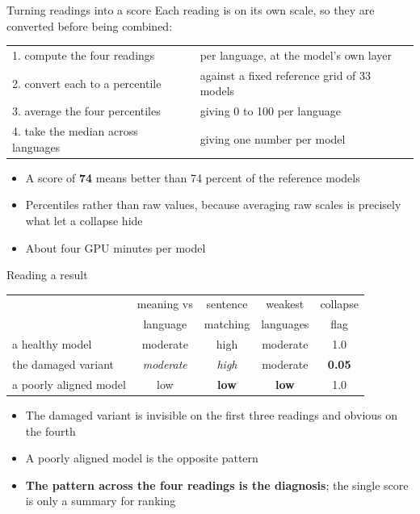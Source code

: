 \documentclass[aspectratio=169,11pt]{beamer}
\newcommand{\Hi}[1]{{\color{acc}\textbf{#1}}}
\newcommand{\Bad}[1]{{\color{warn}\textbf{#1}}}
\begin{document}
\begin{frame}{Turning readings into a score}
Each reading is on its own scale, so they are converted before being
combined:
\vspace{10pt}
\begin{center}\small
\begin{tabular}{ll}
\toprule
1. compute the four readings & per language, at the model's own layer\\
2. convert each to a percentile & against a fixed reference grid of 33
models\\
3. average the four percentiles & giving 0 to 100 per language\\
4. take the median across languages & giving one number per model\\
\bottomrule
\end{tabular}
\end{center}
\vspace{12pt}
\begin{itemize}\setlength\itemsep{4pt}
\item A score of \Hi{74} means better than 74 percent of the reference
models
\item Percentiles rather than raw values, because averaging raw scales
is precisely what let a collapse hide
\item About four GPU minutes per model
\end{itemize}
\end{frame}

\begin{frame}{Reading a result}
\begin{center}\small
\begin{tabular}{lcccc}
\toprule
& meaning vs & sentence & weakest & collapse\\
& language & matching & languages & flag\\
\midrule
a healthy model & moderate & high & moderate & 1.0\\
the damaged variant & \emph{moderate} & \emph{high} & moderate &
\Bad{0.05}\\
a poorly aligned model & low & \Bad{low} & \Bad{low} & 1.0\\
\bottomrule
\end{tabular}
\end{center}
\vspace{12pt}
\begin{itemize}\setlength\itemsep{5pt}
\item The damaged variant is invisible on the first three readings and
obvious on the fourth
\item A poorly aligned model is the opposite pattern
\item \Hi{The pattern across the four readings is the diagnosis}; the
single score is only a summary for ranking
\end{itemize}
\end{frame}
\end{document}
